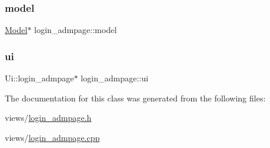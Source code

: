 \subsubsection{\texorpdfstring{model}{model}}
{\footnotesize\ttfamily \hyperlink{classModel}{Model}$\ast$ login\+\_\+admpage\+::model\hspace{0.3cm}{\ttfamily [private]}}

\mbox{\label{classlogin__admpage_a2cffa7dd24ff7c387d80bfc8bc8e2e55}} 
\subsubsection{\texorpdfstring{ui}{ui}}
{\footnotesize\ttfamily Ui\+::login\+\_\+admpage$\ast$ login\+\_\+admpage\+::ui\hspace{0.3cm}{\ttfamily [private]}}



The documentation for this class was generated from the following files\+:\begin{DoxyCompactItemize}
\item 
views/\hyperlink{login__admpage_8h}{login\+\_\+admpage.\+h}\item 
views/\hyperlink{login__admpage_8cpp}{login\+\_\+admpage.\+cpp}\end{DoxyCompactItemize}
